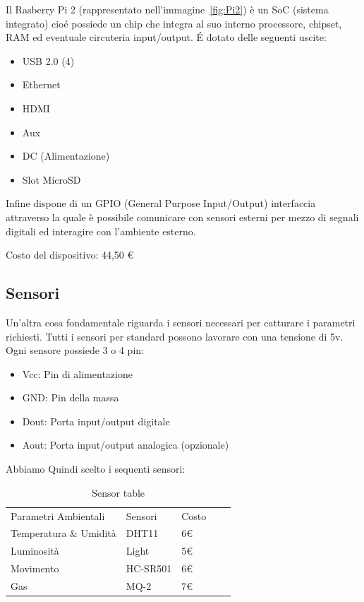 Il Rasberry Pi 2 (rappresentato nell'immagine~\ref{fig:Pi2}) è un SoC (sistema integrato) cio\'e possiede un chip che integra al suo interno processore, chipset, RAM ed eventuale circuteria input/output. \'E dotato delle seguenti uscite:
\begin{itemize}
\item USB 2.0 (4)
\item Ethernet
\item HDMI
\item Aux
\item DC (Alimentazione)
\item Slot MicroSD
\end{itemize}
Infine dispone di un GPIO (General Purpose Input/Output) interfaccia attraverso la quale è possibile comunicare con sensori esterni per mezzo di segnali digitali ed interagire con l'ambiente esterno.

Costo del dispositivo: 44,50 \euro

\subsection{Sensori}

Un'altra cosa fondamentale riguarda i sensori necessari per catturare i parametri richiesti.
Tutti i sensori per standard possono lavorare con una tensione di 5v.
Ogni sensore possiede 3 o 4 pin:

\begin{itemize}
	\item Vcc: Pin di alimentazione
	\item GND: Pin della massa
	\item Dout: Porta input/output digitale
	\item Aout: Porta input/output analogica (opzionale)
\end{itemize}

 Abbiamo Quindi scelto i sequenti sensori:

\begin{table}[]

	\begin{tabular}{lllll}
		\cline{1-3}
		\multicolumn{1}{|l|}{Parametri Ambientali} & \multicolumn{1}{l|}{Sensori} & \multicolumn{1}{l|}{Costo} &  &  \\ \cline{1-3}
		Temperatura \& Umidità                     & DHT11                        & 6\euro                          &  &  \\
		Luminosità                                 & Light                        & 5\euro                          &  &  \\
		Movimento                                  & HC-SR501                     & 6\euro                          &  &  \\
		Gas                                  & MQ-2                   & 7\euro                         &  &
	\end{tabular}
	\centering
	\caption{Sensor table}
	\label{my-label}

\end{table}

